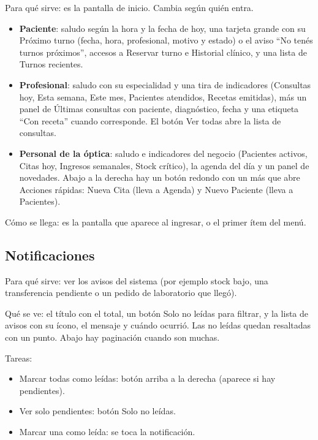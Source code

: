 Para qué sirve: es la pantalla de inicio. Cambia según quién entra.

\begin{itemize}
  \item \textbf{Paciente}: saludo según la hora y la fecha de hoy, una tarjeta grande con su Próximo turno (fecha, hora, profesional, motivo y estado) o el aviso ``No tenés turnos próximos'', accesos a Reservar turno e Historial clínico, y una lista de Turnos recientes.
  \item \textbf{Profesional}: saludo con su especialidad y una tira de indicadores (Consultas hoy, Esta semana, Este mes, Pacientes atendidos, Recetas emitidas), más un panel de Últimas consultas con paciente, diagnóstico, fecha y una etiqueta ``Con receta'' cuando corresponde. El botón Ver todas abre la lista de consultas.
  \item \textbf{Personal de la óptica}: saludo e indicadores del negocio (Pacientes activos, Citas hoy, Ingresos semanales, Stock crítico), la agenda del día y un panel de novedades. Abajo a la derecha hay un botón redondo con un más que abre Acciones rápidas: Nueva Cita (lleva a Agenda) y Nuevo Paciente (lleva a Pacientes).
\end{itemize}

Cómo se llega: es la pantalla que aparece al ingresar, o el primer ítem del menú.

\subsection{Notificaciones}
\label{sec:mu-notificaciones}

Para qué sirve: ver los avisos del sistema (por ejemplo stock bajo, una transferencia pendiente o un pedido de laboratorio que llegó).

Qué se ve: el título con el total, un botón Solo no leídas para filtrar, y la lista de avisos con su ícono, el mensaje y cuándo ocurrió. Las no leídas quedan resaltadas con un punto. Abajo hay paginación cuando son muchas.

Tareas:
\begin{itemize}
  \item Marcar todas como leídas: botón arriba a la derecha (aparece si hay pendientes).
  \item Ver solo pendientes: botón Solo no leídas.
  \item Marcar una como leída: se toca la notificación.
\end{itemize}

